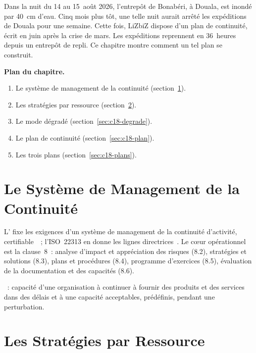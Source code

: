 Dans la nuit du 14 au 15~août 2026, l'entrepôt de Bonabéri, à Douala, est
inondé par 40~cm d'eau. Cinq mois plus tôt, une telle nuit aurait arrêté
les expéditions de Douala pour une semaine. Cette fois, LiZbiZ dispose
d'un plan de continuité, écrit en juin après la crise de mars. Les
expéditions reprennent en 36~heures depuis un entrepôt de repli. Ce
chapitre montre comment un tel plan se construit.

\medskip
\textbf{Plan du chapitre.}
\begin{enumerate}
    \item Le système de management de la continuité (section~\ref{sec:c18-smca}).
    \item Les stratégies par ressource (section~\ref{sec:c18-strategies}).
    \item Le mode dégradé (section~\ref{sec:c18-degrade}).
    \item Le plan de continuité (section~\ref{sec:c18-plan}).
    \item Les trois plans (section~\ref{sec:c18-plans}).
\end{enumerate}

\separateur

\section{Le Système de Management de la Continuité}
\label{sec:c18-smca}

L' fixe les exigences d'un système de management de
la continuité d'activité, certifiable~\cite{iso22301_2019}~; l'ISO~22313
en donne les lignes directrices~\cite{iso22313_2020}. Le cœur opérationnel
est la clause~8~: analyse d'impact et appréciation des risques (8.2),
stratégies et solutions (8.3), plans et procédures (8.4), programme
d'exercices (8.5), évaluation de la documentation et des capacités (8.6).

\begin{boxdef}
~: capacité d'une organisation à
continuer à fournir des produits et des services dans des délais et à une
capacité acceptables, prédéfinis, pendant une perturbation.
\end{boxdef}

\section{Les Stratégies par Ressource}
\label{sec:c18-strategies}

